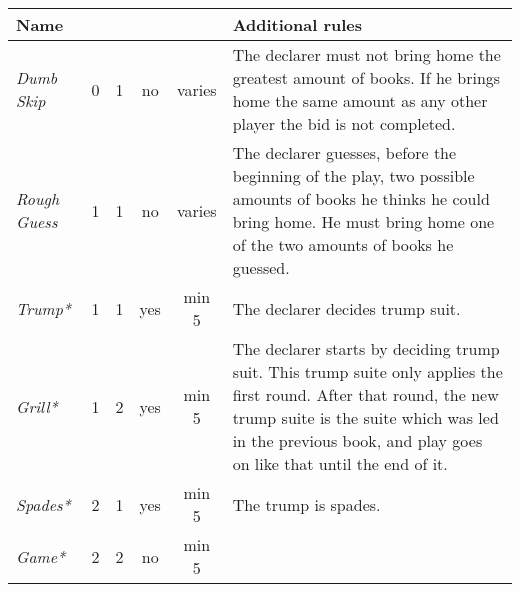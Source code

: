 %
%
%

\begin{table}
	\begin{center}
		\scriptsize {
			\begin{tabular*}{\textwidth}{ lcccc | p{5cm} }
					\textbf{Name} & \rotccw{\textbf{Worth}} & \rotccw{\textbf{Score}} & \rotccw{\textbf{Trump}} & \rotccw{\textbf{Books}} & \textbf{Additional rules}
					\\ \hline
					
					\textit{Dumb Skip} &
					0 & 1 & no & varies &
					The declarer must not bring home the greatest amount of books. If he brings home the same amount as any other player the bid is not completed.
					\\ \hline
					
					\textit{Rough Guess} &
					1 & 1 & no & varies &
					The declarer guesses, before the beginning of the play, two possible amounts of books he thinks he could bring home. He must bring home one of the two amounts of books he guessed.
					\\ \hline
					
					\textit{Trump*} &
					1 & 1 & yes & min 5 &
					The declarer decides trump suit.
					\\ \hline
					
					\textit{Grill*} &
					1 & 2 & yes & min 5 &
					The declarer starts by deciding trump suit. This trump suite only applies the first round. After that round, the new trump suite is the suite which was led in the previous book, and play goes on like that until the end of it. \\ \hline
					\textit{Spades*} &
					2 & 1 & yes & min 5 &
					The trump is spades.
					\\ \hline
					
					\textit{Game*} &
					2 & 2 & no & min 5 &
					\\ \hline
					

\end{tabular*}}
\end{center}
\end{table}
